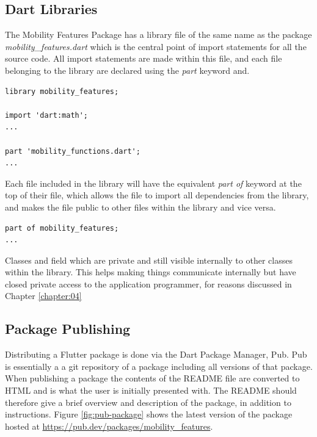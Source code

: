 \subsection{Dart Libraries}
The Mobility Features Package has a library file of the same name as the package \textit{mobility\_features.dart} which is the central point of import statements for all the source code. All import statements are made within this file, and each file belonging to the library are declared using the \textit{part} keyword and. 

\begin{verbatim}
library mobility_features;

import 'dart:math';
...

part 'mobility_functions.dart';
...
\end{verbatim}

Each file included in the library will have the equivalent \textit{part of} keyword at the top of their file, which allows the file to import all dependencies from the library, and makes the file public to other files within the library and vice versa.

\begin{verbatim}
part of mobility_features;
...
\end{verbatim}

Classes and field which are private and still visible internally to other classes within the library. This helps making things communicate internally but have closed private access to the application programmer, for reasons discussed in Chapter \ref{chapter:04}

\subsection{Package Publishing}
Distributing a Flutter package is done via the Dart Package Manager, Pub. Pub is essentially a a git repository of a package including all versions of that package. When publishing a package the contents of the README file are converted to HTML and is what the user is initially presented with. The README should therefore give a brief overview and description of the package, in addition to instructions. Figure \ref{fig:pub-package} shows the latest version of the package hosted at \url{https://pub.dev/packages/mobility_features}.

